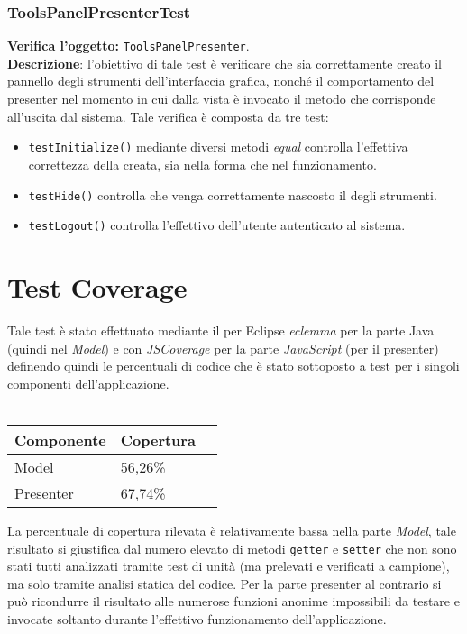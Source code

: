 \subsubsection{ToolsPanelPresenterTest}
\textbf{Verifica l'oggetto:} \texttt{ToolsPanelPresenter}.\\
\textbf{Descrizione}: l'obiettivo di tale test è verificare che sia correttamente creato il pannello degli strumenti dell'interfaccia grafica, nonché il comportamento del presenter nel momento in cui dalla vista è invocato il metodo che corrisponde all'uscita dal sistema.
Tale verifica è composta da tre test:
\begin{itemize}
\item \texttt{testInitialize()} mediante diversi metodi \textit{equal} controlla l'effettiva correttezza della  creata, sia nella forma che nel funzionamento.
\item \texttt{testHide()} controlla che venga correttamente nascosto il  degli strumenti.
\item \texttt{testLogout()} controlla l'effettivo  dell'utente autenticato al sistema.
\end{itemize}
\clearpage

\section{Test Coverage}
Tale test è stato effettuato mediante il \underline{} per Eclipse \textit{eclemma} per la parte Java (quindi nel \textit{Model}) e con \textit{JSCoverage} per la parte \textit{JavaScript} (per il presenter) definendo quindi le percentuali di codice che è stato sottoposto a test per i singoli componenti dell'applicazione.\\\\

\begin{center}
\begin{longtable}{p{}ll}
\toprule Componente & Copertura\\
\midrule
Model & 56,26\%\\
Presenter & 67,74\% \\
\bottomrule
\end{longtable}
\end{center}

La percentuale di copertura rilevata è relativamente bassa nella parte \textit{Model}, tale risultato si giustifica dal numero elevato di metodi \texttt{getter} e \texttt{setter} che non sono stati tutti analizzati tramite test di unità (ma prelevati e verificati a campione), ma solo tramite analisi statica del codice. Per la parte presenter al contrario si può ricondurre il risultato alle numerose funzioni anonime impossibili da testare e invocate soltanto durante l'effettivo funzionamento dell'applicazione.

